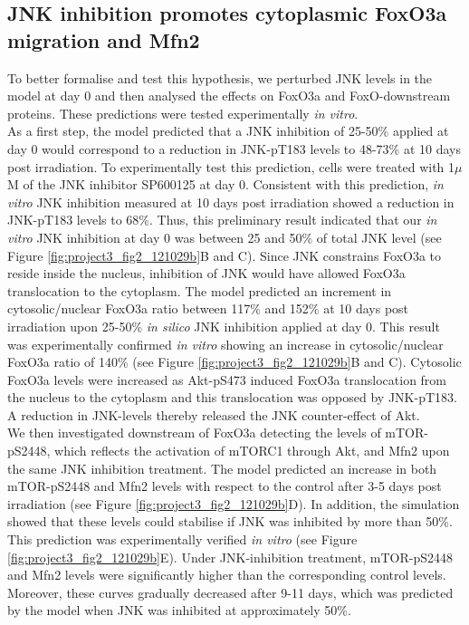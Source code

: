 \subsection{JNK inhibition promotes cytoplasmic FoxO3a migration and Mfn2}
\label{project3-subsec:JNK inhibition promotes cytoplasmic FoxO3a migration and Mfn2}
To better formalise and test this hypothesis, we perturbed JNK levels in the model at day 0 and then analysed the effects on FoxO3a and FoxO-downstream proteins. These predictions were tested experimentally \emph{in vitro}.\\ 
As a first step, the model predicted that a JNK inhibition of 25-50\% applied at day 0 would correspond to a reduction in JNK-pT183 levels to 48-73\% at 10 days post irradiation. To experimentally test this prediction, cells were treated with 1$\mu$M of the JNK inhibitor SP600125 at day 0. Consistent with this prediction, \emph{in vitro} JNK inhibition measured at 10 days post irradiation showed a reduction in JNK-pT183 levels to 68\%. Thus, this preliminary result indicated that our \emph{in vitro} JNK inhibition at day 0 was between 25 and 50\% of total JNK level (see Figure \ref{fig:project3_fig2_121029b}B and C). Since JNK constrains FoxO3a to reside inside the nucleus, inhibition of JNK would have allowed FoxO3a translocation to the cytoplasm. The model predicted an increment in cytosolic/nuclear FoxO3a ratio between 117\% and 152\% at 10 days post irradiation upon 25-50\% \emph{in silico} JNK inhibition applied at day 0. This result was experimentally confirmed \emph{in vitro} showing an increase in 
cytosolic/nuclear FoxO3a ratio of 140\% (see Figure \ref{fig:project3_fig2_121029b}B and C). Cytosolic FoxO3a levels were increased as Akt-pS473 induced FoxO3a translocation from the nucleus to the cytoplasm and this translocation was opposed by JNK-pT183. A reduction in JNK-levels thereby released the JNK counter-effect of Akt.\\ 
We then investigated downstream of FoxO3a detecting the levels of mTOR-pS2448, which reflects the activation of mTORC1 through Akt, and Mfn2 upon the same JNK inhibition treatment. The model predicted an increase in both mTOR-pS2448 and Mfn2 levels with respect to the control after 3-5 days post irradiation (see Figure \ref{fig:project3_fig2_121029b}D). In addition, the simulation showed that these levels could stabilise if JNK was inhibited by more than 50\%. This prediction was experimentally verified \emph{in vitro} (see Figure \ref{fig:project3_fig2_121029b}E). Under JNK-inhibition treatment, mTOR-pS2448 and Mfn2 levels were significantly higher than the corresponding control levels. Moreover, these curves gradually decreased after 9-11 days, which was predicted by the model when JNK was inhibited at approximately 50\%.\\
